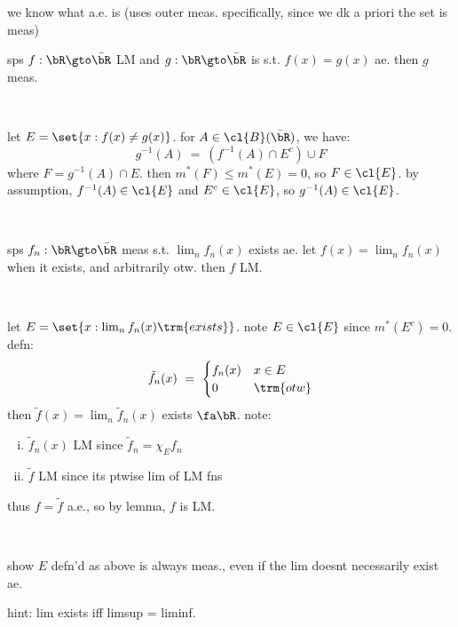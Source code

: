 we know what a.e. is (uses outer meas. specifically, since we dk
a priori the set is meas)

\begin{lm}
	sps $f:\bR\gto\bar{\bR}$ LM and $g:\bR\gto\bar{\bR}$ is s.t. $f(x)=g(x)$ ae.
	then $g$ meas.
\end{lm} \

\begin{pf}
	let $E=\set{x:f(x)\neq g(x)}$.
	for $A\in\cl{B}(\bar{\bR})$, we have:
	\begin{equation*}
		g^{-1}(A) \ = \ (f^{-1}(A)\cap E^{c}) \cup F
	\end{equation*}
	where $F=g^{-1}(A)\cap E$.
	then $m^{*}(F)\leq m^{*}(E)=0$, so $F\in\cl{E}$.
	by assumption, $f^{-1}(A)\in\cl{E}$ and $E^{c}\in\cl{E}$,
	so $g^{-1}(A)\in\cl{E}$.
\end{pf} \

\begin{crll}
	sps $f_{n}:\bR\gto\bar{\bR}$ meas s.t. $\lim_{n}f_{n}(x)$ exists ae.
	let $f(x)=\lim_{n}f_{n}(x)$ when it exists, and arbitrarily otw.
	then $f$ LM.
\end{crll} \

\begin{pf}
	let $E=\set{x:\lim_{n}f_{n}(x) \trm{ exists}}$.
	note $E\in\cl{E}$ since $m^{*}(E^{c})=0$.
	defn:
	\begin{equation*}
		\tilde{f}_{n}(x) \ = \
		\begin{cases} f_{n}(x) & x \in E \\ 0 & \trm{otw} \end{cases}
	\end{equation*}
	then $\tilde{f}(x)=\lim_{n}\tilde{f}_{n}(x)$ exists $\fa \bR$.
	note:
	\begin{enumerate}[i)]
		\item $\tilde{f}_{n}(x)$ LM since $\tilde{f}_{n}=\chi_{E}f_{n}$
		\item $\tilde{f}$ LM since its ptwise lim of LM fns
	\end{enumerate}
	thus $f=\tilde{f}$ a.e., so by lemma, $f$ is LM.
\end{pf} \

\begin{exr}
	show $E$ defn'd as above is always meas., even if the lim
	doesnt necessarily exist ae.
\end{exr}
hint: lim exists iff limsup = liminf.

